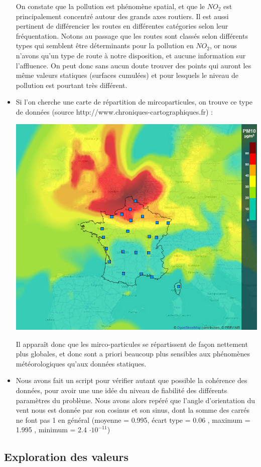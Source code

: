 \begin{itemize}
    On constate que la pollution est phénomène spatial, et que le $NO_2$ est principalement concentré autour des grands axes routiers. Il est aussi pertinent de différencier les routes en différentes catégories selon leur fréquentation. Notons au passage que les routes sont classés selon différents types qui semblent être déterminants pour la pollution en $NO_2$, or nous n'avons qu'un type de route à notre disposition, et aucune information sur l'affluence. On peut donc sans aucun doute trouver des points qui auront les même valeurs statiques (surfaces cumulées) et pour lesquels le niveau de pollution est pourtant très différent.   
  \item
  	Si l'on cherche une carte de répartition de mircoparticules, on trouve ce type de données (source http://www.chroniques-cartographiques.fr) :
  	\begin{center}
  		\includegraphics[width = 0.5\linewidth]{images/francepm10.jpg}
  	\end{center}    
  	Il apparaît donc que les mirco-particules se répartissent de façon nettement plus globales, et donc sont a priori beaucoup plus sensibles aux phénomènes météorologiques qu'aux données statiques.
  \item
    Nous avons fait un script pour vérifier autant que possible la cohérence des données, pour avoir une une idée du niveau de fiabilité des différents paramètres du problème. Nous avons alors repéré que l'angle d'orientation du vent nous est donnée par son cosinus et son sinus, dont la somme des carrés ne font pas 1 en général (moyenne = 0.995, écart type =  0.06 , maximum =  1.995 , minimum = 2.4 $\cdot 10^{-11}$)
 
    
\end{itemize}



\subsection{Exploration des valeurs}

